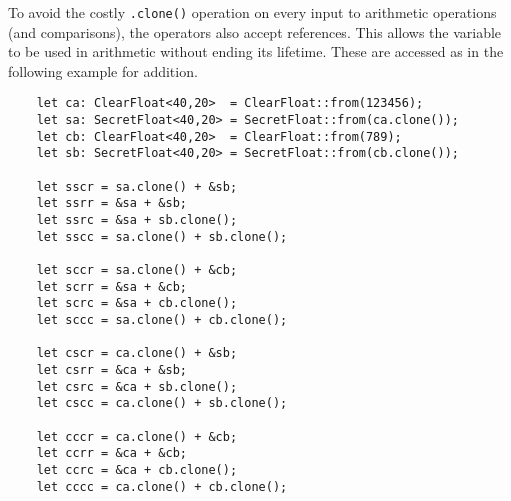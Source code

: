 To avoid the costly \verb|.clone()| operation on every input to arithmetic 
operations (and comparisons), the operators also accept references. This 
allows the variable to be used in arithmetic without ending its lifetime.
These are accessed as in the following example for addition.
\begin{lstlisting}
    let ca: ClearFloat<40,20>  = ClearFloat::from(123456);
    let sa: SecretFloat<40,20> = SecretFloat::from(ca.clone());
    let cb: ClearFloat<40,20>  = ClearFloat::from(789);
    let sb: SecretFloat<40,20> = SecretFloat::from(cb.clone());

    let sscr = sa.clone() + &sb;
    let ssrr = &sa + &sb;
    let ssrc = &sa + sb.clone();
    let sscc = sa.clone() + sb.clone();

    let sccr = sa.clone() + &cb;
    let scrr = &sa + &cb;
    let scrc = &sa + cb.clone();
    let sccc = sa.clone() + cb.clone();

    let cscr = ca.clone() + &sb;
    let csrr = &ca + &sb;
    let csrc = &ca + sb.clone();
    let cscc = ca.clone() + sb.clone();

    let cccr = ca.clone() + &cb;
    let ccrr = &ca + &cb;
    let ccrc = &ca + cb.clone();
    let cccc = ca.clone() + cb.clone();
\end{lstlisting}


